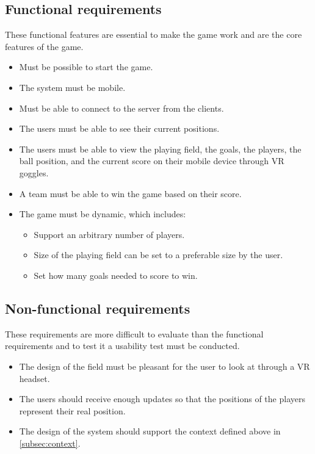 \subsection{Functional requirements}
These functional features are essential to make the game work and are the core features of the game.

\begin{itemize}
    \item Must be possible to start the game.
    \item The system must be mobile.
    \item Must be able to connect to the server from the clients.
    \item The users must be able to see their current positions.
    \item The users must be able to view the playing field, the goals, the players, the ball position, and the current score on their mobile device through VR goggles.
    \item A team must be able to win the game based on their score.
    \item The game must be dynamic, which includes:
          \begin{itemize}
              \item Support an arbitrary number of players.
              \item Size of the playing field can be set to a preferable size by the user.
              \item Set how many goals needed to score to win.
          \end{itemize}
\end{itemize}

\subsection{Non-functional requirements}
These requirements are more difficult to evaluate than the functional requirements and to test it a usability test must be conducted.
\begin{itemize}
    \item The design of the field must be pleasant for the user to look at through a VR headset.
    \item The users should receive enough updates so that the positions of the players represent their real position.
    \item The design of the system should support the context defined above in \autoref{subsec:context}.
\end{itemize}
